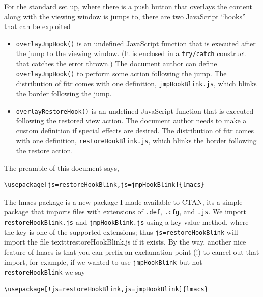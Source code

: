 \documentclass{article}
\def\fitrpkg{\textsf{f{i}tr}}
\begin{document}
For the standard set up, where there is a push button that overlays the
content along with the viewing window is jumps to, there are two
JavaScript ``hooks'' that can be exploited
\begin{itemize}
    \item \texttt{overlayJmpHook()} is an undefined JavaScript
        function that is executed after the jump to the viewing
        window. (It is enclosed in a \texttt{try/catch} construct that
        catches the error thrown.) The document author can define
        \texttt{overlayJmpHook()} to perform some action following the
        jump. The distribution of {\fitrpkg} comes with one
        definition, \texttt{jmpHookBlink.js}, which blinks the border
        following the jump.
    \item \texttt{overlayRestoreHook()} is an undefined JavaScript
        function that is executed following the restored view action.
        The document author needs to make a custom definition if
        special effects are desired. The distribution of {\fitrpkg}
        comes with one definition, \texttt{restoreHookBlink.js},
        which blinks the border following the restore action.
\end{itemize}
The preamble of this document says,
\begin{Verbatim}[xleftmargin=20pt]
\usepackage[js=restoreHookBlink,js=jmpHookBlink]{lmacs}
\end{Verbatim}
The \textsf{lmacs} package is a new package I made available to CTAN, its
a simple package that imports files with extensions of \texttt{.def}, \texttt{.cfg}, and
\texttt{.js}. We import \texttt{restoreHookBlink.js} and
\texttt{jmpHookBlink.js} using a key-value method, where the key is one of
the supported extensions; thus \texttt{js=restoreHookBlink} will import
the file texttt{restoreHookBlink.js} if it exists. By the way, another
nice feature of \textsf{lmacs} is that you can prefix an exclamation point
(!) to cancel out that import, for example, if we wanted to use \texttt{jmpHookBlink}
but not \texttt{restoreHookBlink} we say
\begin{Verbatim}[xleftmargin=20pt]
\usepackage[!js=restoreHookBlink,js=jmpHookBlink]{lmacs}
\end{Verbatim}
\end{document}
